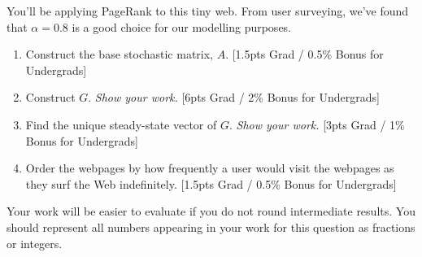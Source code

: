 You'll be applying PageRank to this tiny web. From user surveying, we've found that $\alpha=0.8$ is a good choice for our modelling purposes.

\begin{enumerate}[label=\alph*.]
    \item Construct the base stochastic matrix, $A$. [1.5pts Grad / 0.5\% Bonus for Undergrads] %
    \item Construct $G$. \emph{Show your work.} [6pts Grad / 2\% Bonus for Undergrads]
    \item Find the unique steady-state vector of $G$. \emph{Show your work.} [3pts Grad / 1\% Bonus for Undergrads]
    \item Order the webpages by how frequently a user would visit the webpages as they surf the Web indefinitely. [1.5pts Grad / 0.5\% Bonus for Undergrads] %
\end{enumerate}
\begin{warningbox}
    Your work will be easier to evaluate if you do not round intermediate results. You should represent all numbers appearing in your work for this question as fractions or integers.
\end{warningbox}
\newpage
